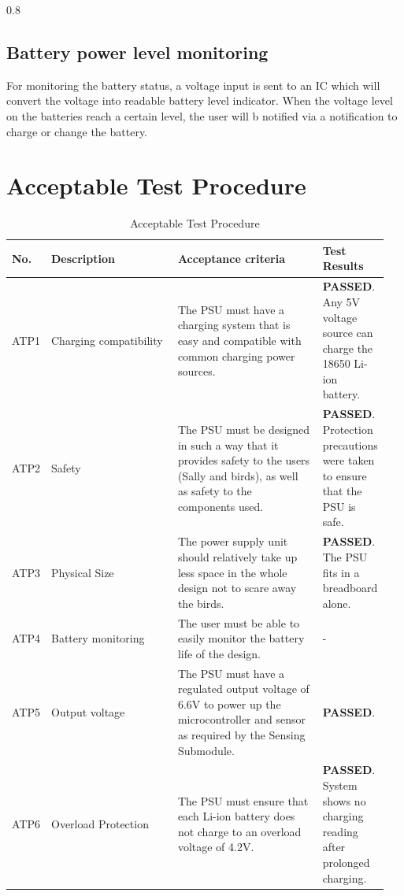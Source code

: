 \documentclass[class=report,11pt,crop=false]{standalone}
\begin{document}
\begin{table}[h!]
\begin{tabularx}{0.8\textwidth}
{{	
	\subsection{Battery power level monitoring}
	For monitoring the battery status, a voltage input is sent to an IC which will convert the voltage into readable battery level indicator. When the voltage level on the batteries reach a certain level, the user will b notified via a notification to charge or change the battery.  
	
	\section{Acceptable Test Procedure}
	\begin{table}[h!]
		\centering
		\caption{Acceptable Test Procedure}
		\label{tab:P3}
		\begin{tabularx}{0.9\textwidth}{|>{\centering\arraybackslash}m{0.05\linewidth}|>{\centering\arraybackslash}m{0.35\linewidth}|>{\centering\arraybackslash}m{0.4\linewidth}|>{\centering\arraybackslash}m{0.15\linewidth}|}
			\hline
			\textbf{No.} & \textbf{Description} & \textbf{Acceptance criteria} & \textbf{Test Results} \\
			\hline
			ATP1 & Charging compatibility & The PSU must have a charging system that is easy and compatible with common charging power sources. & \textbf{PASSED}. Any 5V voltage source can charge the 18650 Li-ion battery. \\
			\hline
			ATP2 & Safety & The PSU must be designed in such a way that it provides safety to the users (Sally and birds), as well as safety to the components used. & \textbf{PASSED}. Protection precautions were taken to ensure that the PSU is safe. \\
			\hline
			ATP3 & Physical Size & The power supply unit should relatively take up less space in the whole design not to scare away the birds. & \textbf{PASSED}. The PSU fits in a breadboard alone. \\
			\hline
			ATP4 & Battery monitoring & The user must be able to easily monitor the battery life of the design. & - \\
			\hline
			ATP5 & Output voltage & The PSU must have a regulated output voltage of 6.6V to power up the microcontroller and sensor as required by the Sensing Submodule. & \textbf{PASSED}. \\
			\hline
			ATP6 & Overload Protection & The PSU must ensure that each Li-ion battery does not charge to an overload voltage of 4.2V. & \textbf{PASSED}. System shows no charging reading after prolonged charging. \\

\end{tabularx}
\end{table}}}
\end{tabularx}
\end{table}
\end{document}

